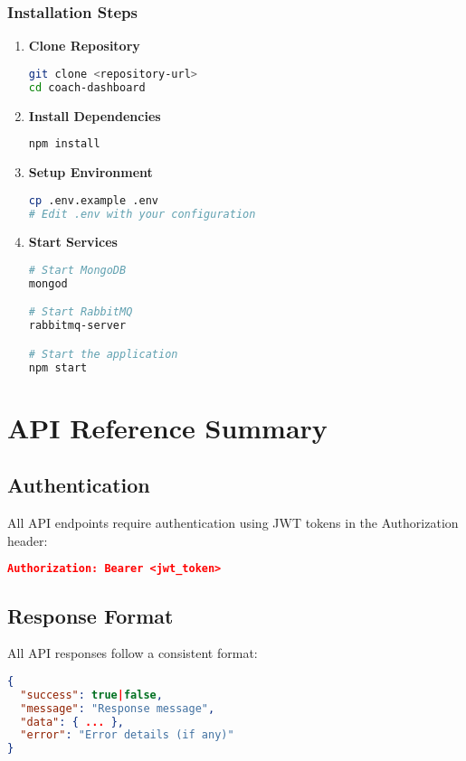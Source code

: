 \documentclass[12pt,a4paper]{article}
\newcommand{\samplecode}[1]{\begin{lstlisting}[language=JSON]#1\end{lstlisting}}
\begin{document}
\subsubsection{Installation Steps}
\begin{enumerate}
    \item \textbf{Clone Repository}
    \begin{lstlisting}[language=bash]
git clone <repository-url>
cd coach-dashboard
    \end{lstlisting}
    
    \item \textbf{Install Dependencies}
    \begin{lstlisting}[language=bash]
npm install
    \end{lstlisting}
    
    \item \textbf{Setup Environment}
    \begin{lstlisting}[language=bash]
cp .env.example .env
# Edit .env with your configuration
    \end{lstlisting}
    
    \item \textbf{Start Services}
    \begin{lstlisting}[language=bash]
# Start MongoDB
mongod

# Start RabbitMQ
rabbitmq-server

# Start the application
npm start
    \end{lstlisting}
\end{enumerate}

\section{API Reference Summary}

\subsection{Authentication}
All API endpoints require authentication using JWT tokens in the Authorization header:
\samplecode{
Authorization: Bearer <jwt_token>
}

\subsection{Response Format}
All API responses follow a consistent format:
\samplecode{
{
  "success": true|false,
  "message": "Response message",
  "data": { ... },
  "error": "Error details (if any)"
}
}
\end{document}
